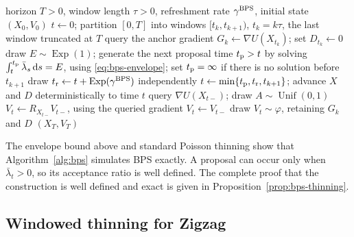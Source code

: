 \documentclass{amsart}
\theoremstyle{plain}
\theoremstyle{definition}
\theoremstyle{remark}
\newcommand{\ud}{\,\mathrm{d}}
\newcommand{\1}{\mathbf 1}
\newcommand{\dd}{\ud}
\newcommand{\bps}{{\rm BPS}}
\begin{document}
\begin{algorithm}[htb]
\caption{Windowed thinning for BPS}\label{alg:bps}
\begin{algorithmic}[1]
\REQUIRE horizon $T>0$, window length $\tau>0$, refreshment rate
         $\gamma^{\bps}$, initial state $(X_0,V_0)$
\STATE $t\gets0$; partition $[0,T]$ into windows $[t_k,t_{k+1})$,
       $t_k=k\tau$, the last window truncated at $T$
\FOR{each nonempty window $[t_k,t_{k+1})$}
  \STATE query the anchor gradient $G_k\gets\nabla U(X_{t_k})$; set
         $D_{t_k}\gets0$
    \STATE draw $E\sim\operatorname{Exp}(1)$; generate the next proposal time
           $t_{\rm p}>t$ by solving
           $\int_t^{t_{\rm p}}\bar\lambda_s\dd s=E$, using
           \eqref{eq:bps-envelope}; set $t_{\rm p}=\infty$ if there is no
           solution before $t_{k+1}$
    \STATE draw $t_{\rm r}\gets t+\operatorname{Exp}(\gamma^{\bps})$
           independently
    \STATE $t\gets\min\{t_{\rm p},t_{\rm r},t_{k+1}\}$; advance $X$ and $D$
           deterministically to time $t$
      \STATE query $\nabla U(X_{t-})$; draw
             $A\sim\operatorname{Unif}(0,1)$
      \IF{$A\le\lambda^{\bps}(X_{t-},V_{t-})/\bar\lambda_t$}
        \STATE $V_t\gets R_{X_{t-}} V_{t-}$, using the queried gradient
      \ELSE
        \STATE $V_t\gets V_{t-}$
      \ENDIF
      \STATE draw $V_t\sim\varphi$, retaining $G_k$ and $D$
    \ENDIF
  \ENDWHILE
\ENDFOR
\RETURN $(X_T,V_T)$
\end{algorithmic}
\end{algorithm}

The envelope bound above and standard Poisson thinning show that
Algorithm~\ref{alg:bps} simulates BPS exactly.  A proposal can occur only when
$\bar\lambda_t>0$, so its acceptance ratio is well defined.  The complete
proof that the construction is well defined and exact is given in
Proposition~\ref{prop:bps-thinning}.

\subsection{Windowed thinning for Zigzag}\label{ssec:wt-zz}
\end{document}
